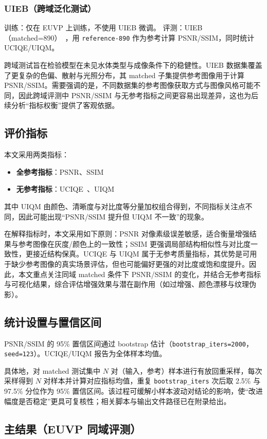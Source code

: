 \documentclass[a4paper,zihao=-4,linespread=1.25]{ctexart}
\begin{document}
\subsubsection{UIEB（跨域泛化测试）}
训练：仅在 EUVP 上训练，不使用 UIEB 微调。
评测：UIEB（matched=890）~\cite{1}，用 \texttt{reference-890} 作为参考计算 PSNR/SSIM，同时统计 UCIQE/UIQM。

跨域测试旨在检验模型在未见水体类型与成像条件下的稳健性。UIEB 数据集覆盖了更复杂的色偏、散射与光照分布，其 matched 子集提供参考图像用于计算 PSNR/SSIM。需要强调的是，不同数据集的参考图像获取方式与图像风格可能不同，因此跨域评测中 PSNR/SSIM 与无参考指标之间更容易出现差异，这也为后续分析“指标权衡”提供了客观依据。

\subsection{评价指标}
本文采用两类指标：
\begin{itemize}
    \item \textbf{全参考指标}：PSNR、SSIM~\cite{8}
    \item \textbf{无参考指标}：UCIQE~\cite{11}、UIQM~\cite{12}
\end{itemize}
其中 UIQM 由颜色、清晰度与对比度等分量加权组合得到，不同指标关注点不同，因此可能出现“PSNR/SSIM 提升但 UIQM 不一致”的现象。

在解释指标时，本文采用如下原则：PSNR 对像素级误差敏感，适合衡量增强结果与参考图像在灰度/颜色上的一致性；SSIM 更强调局部结构相似性与对比度一致性，更接近结构保真。UCIQE 与 UIQM 属于无参考质量指标，其优势是可用于缺少参考图像的真实场景评估，但也可能偏好更强的对比度或饱和度提升。因此，本文重点关注同域 matched 条件下 PSNR/SSIM 的变化，并结合无参考指标与可视化结果，综合评估增强效果与潜在副作用（如过增强、颜色漂移与纹理伪影）。

\subsection{统计设置与置信区间}
PSNR/SSIM 的 95\% 置信区间通过 bootstrap 估计（\texttt{bootstrap\_iters=2000}，\texttt{seed=123}）。UCIQE/UIQM 报告为全体样本均值。

具体地，对 matched 测试集中 $N$ 对（输入，参考）样本进行有放回重采样，每次采样得到 $N$ 对样本并计算对应指标均值，重复 \texttt{bootstrap\_iters} 次后取 2.5\% 与 97.5\% 分位作为 95\% 置信区间。该过程可缓解小样本波动对结论的影响，使“改进幅度是否稳定”更具可复核性；相关脚本与输出文件路径已在附录给出。

\subsection{主结果（EUVP 同域评测）}
\end{document}
